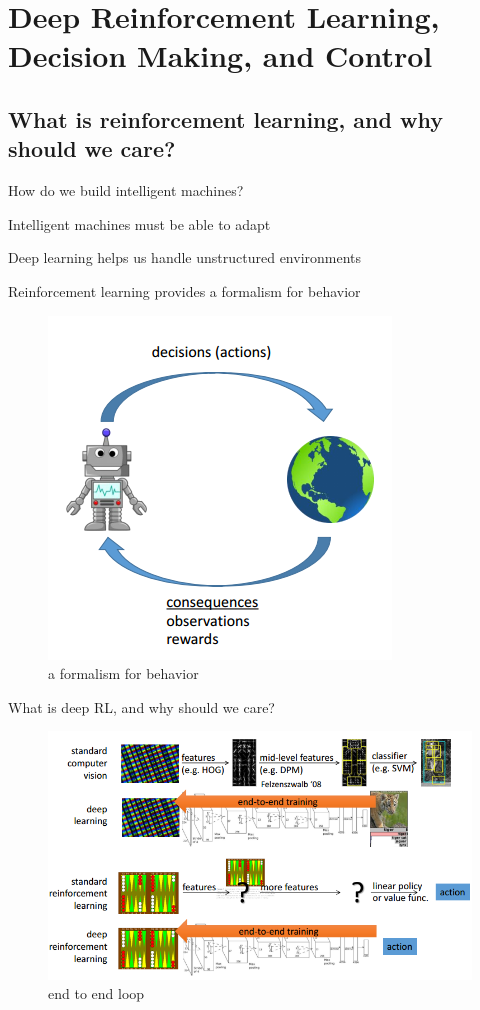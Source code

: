 \newpage{}
\section{Deep Reinforcement Learning, Decision Making, and Control}


\subsection{What is reinforcement learning, and why should we care?}
How do we build intelligent machines?

Intelligent machines must be able to adapt

Deep learning helps us handle unstructured environments

Reinforcement learning provides a formalism for behavior
\begin{figure}[h!] %
	\centering
	\includegraphics[width=0.5\linewidth]{img/1-formalism.png}
	\caption{a formalism for behavior}\label{img:1-formalism}
\end{figure}


What is deep RL, and why should we care?
\begin{figure}[h!] %
	\centering
	\includegraphics[width=0.8\linewidth]{img/1-end-to-end.png}
	\caption{end to end loop}\label{img:1-end-to-end}
\end{figure}


